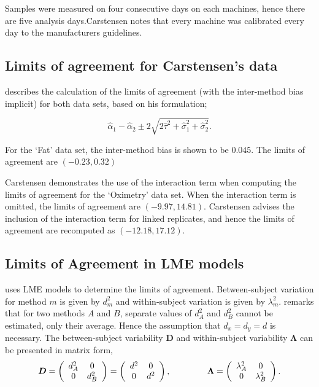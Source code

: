 \documentclass[12pt, a4paper]{report}
\theoremstyle{plain}
\theoremstyle{definition}
\theoremstyle{remark}
\begin{document}
Samples were measured on four consecutive days on each machines, hence there are five analysis days.Carstensen notes that every machine was calibrated every day to  the manufacturers guidelines.


\subsection{Limits of agreement for Carstensen's data}


\citet{bxc2008} describes the calculation of the limits of agreement (with the inter-method bias implicit) for both data sets, based on his formulation;

\[\hat{\alpha}_1 - \hat{\alpha}_2 \pm 2\sqrt{2\hat{\tau}^2 +\hat{\sigma}_1^2 +\hat{\sigma}_2^2 }.\]

For the `Fat' data set, the inter-method bias is shown to be $0.045$. The limits of agreement are $(-0.23 , 0.32)$

Carstensen demonstrates the use of the interaction term when computing the limits of agreement for the `Oximetry' data set. When the interaction term is omitted, the limits of agreement are $(-9.97, 14.81)$. Carstensen advises the inclusion of the interaction term for linked replicates, and hence the limits of agreement are recomputed as $(-12.18,17.12)$.


\newpage

\subsection{Limits of Agreement in LME models}
\citet{bxc2008} uses LME models to determine the limits of agreement. Between-subject variation for method $m$ is given by $d^2_{m}$ and within-subject variation is given by $\lambda^2_{m}$.  \citet{BXC2008} remarks that for two methods $A$ and $B$, separate values of $d^2_{A}$ and $d^2_{B}$ cannot be estimated, only their average. Hence the assumption that $d_{x}= d_{y}= d$ is necessary. The between-subject variability $\boldsymbol{D}$ and within-subject variability $\boldsymbol{\Lambda}$ can be presented in matrix form,\[
\boldsymbol{D} = \left(%
\begin{array}{cc}
   d^2_{A}& 0 \\
  0 & d^2_{B} \\
\end{array}%
\right)=\left(%
\begin{array}{cc}
   d^2& 0 \\
  0 & d^2\\
\end{array}%
\right),
\hspace{1.5cm}
\boldsymbol{\Lambda} = \left(%
\begin{array}{cc}
   \lambda^2_{A}& 0 \\
  0 & \lambda^2_{B} \\
\end{array}%
\right).
\]
\end{document}
